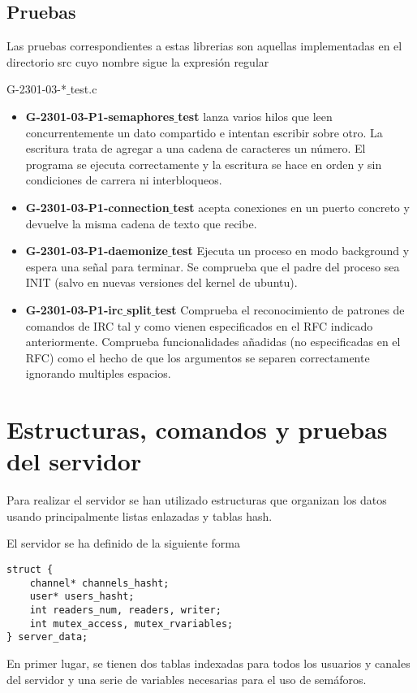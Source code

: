 \documentclass{mathnotes}
\begin{document}
\subsection{Pruebas}
Las pruebas correspondientes a estas librerias son aquellas implementadas en el directorio src cuyo nombre sigue la expresión regular
\begin{center}
G-2301-03-*$\_$test.c
\end{center}
\begin{itemize}
\item \textbf{G-2301-03-P1-semaphores$\_$test} lanza varios hilos que leen concurrentemente un dato compartido e intentan escribir sobre otro. La escritura trata de agregar a una cadena de caracteres un número. El programa se ejecuta correctamente y la escritura se hace en orden y sin condiciones de carrera ni interbloqueos.
\item \textbf{G-2301-03-P1-connection$\_$test} acepta conexiones en un puerto concreto y devuelve la misma cadena de texto que recibe.
\item \textbf{G-2301-03-P1-daemonize$\_$test} Ejecuta un proceso en modo background y espera una señal para terminar. Se comprueba que el padre del proceso sea INIT (salvo en nuevas versiones del kernel de ubuntu).
\item \textbf{G-2301-03-P1-irc$\_$split$\_$test} Comprueba el reconocimiento de patrones de comandos de IRC tal y como vienen especificados en el RFC indicado anteriormente. Comprueba funcionalidades añadidas (no especificadas en el RFC) como el hecho de que los argumentos se separen correctamente ignorando multiples espacios.
\end{itemize}

\section{Estructuras, comandos y pruebas del servidor}
Para realizar el servidor se han utilizado estructuras que organizan los datos usando principalmente listas enlazadas y tablas hash.

El servidor se ha definido de la siguiente forma

\begin{lstlisting}
struct {
    channel* channels_hasht;
    user* users_hasht;
    int readers_num, readers, writer; 
    int mutex_access, mutex_rvariables;
} server_data;
\end{lstlisting}

En primer lugar, se tienen dos tablas indexadas para todos los usuarios y canales del servidor y una serie de variables necesarias para el uso de semáforos.
\end{document}
